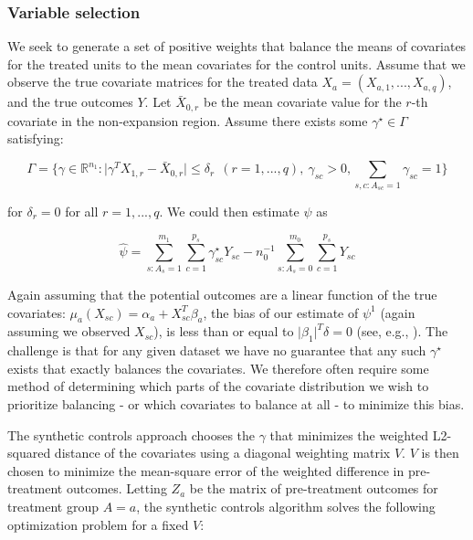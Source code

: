 \documentclass[article]{imsart}
\theoremstyle{plain}
\theoremstyle{remark}
\begin{document}
\subsubsection{Variable selection}

We seek to generate a set of positive weights that balance the means of covariates for the treated units to the mean covariates for the control units. Assume that we observe the true covariate matrices for the treated data $X_a = (X_{a,1}, ..., X_{a, q})$, and the true outcomes $Y$. Let $\bar{X}_{0, r}$ be the mean covariate value for the $r$-th covariate in the non-expansion region. Assume there exists some $\gamma^\star \in \Gamma$ satisfying: 

\begin{equation}\label{eqn:constraint}
\Gamma = \{\gamma \in \mathbb{R}^{n_1}: \lvert \gamma^TX_{1, r} - \bar{X}_{0, r} \lvert \le \delta_r \ \ (r = 1, ..., q), \ \gamma_{sc} > 0, \sum_{s, c: A_{sc} = 1}\gamma_{sc} = 1\}
\end{equation}

for $\delta_r = 0$ for all $r = 1, ..., q$. We could then estimate $\psi$ as

\begin{equation}\label{eqn:psi}
\hat{\psi} = \sum_{s: A_s = 1}^{m_1}\sum_{c = 1}^{p_s}\gamma_{sc}^\star Y_{sc} - n_0^{-1}\sum_{s: A_s = 0}^{m_0}\sum_{c = 1}^{p_s}Y_{sc}
\end{equation}

Again assuming that the potential outcomes are a linear function of the true covariates: $\mu_a(X_{sc}) = \alpha_a + X_{sc}^T\beta_a$, the bias of our estimate of $\psi^1$ (again assuming we observed $X_{sc}$), is less than or equal to $\lvert\beta_1\rvert^T\delta = 0$ (see, e.g., \cite{zubizarreta2015stable}). The challenge is that for any given dataset we have no guarantee that any such $\gamma^\star$ exists that exactly balances the covariates. We therefore often require some method of determining which parts of the covariate distribution we wish to prioritize balancing - or which covariates to balance at all - to minimize this bias.

The synthetic controls approach chooses the $\gamma$ that minimizes the weighted L2-squared distance of the covariates using a diagonal weighting matrix $V$. $V$ is then chosen to minimize the mean-square error of the weighted difference in pre-treatment outcomes. Letting $Z_a$ be the matrix of pre-treatment outcomes for treatment group $A = a$, the synthetic controls algorithm solves the following optimization problem for a fixed $V$:
\end{document}
